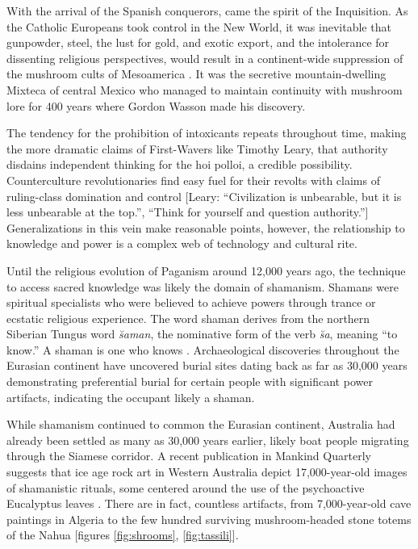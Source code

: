 \documentclass{UIdahoMastersThesis}
\begin{document}
With the arrival of the Spanish conquerors, came the spirit of the Inquisition. As the Catholic Europeans took control in the New World, it was inevitable that gunpowder, steel, the lust for gold, and exotic export, and the intolerance for dissenting religious perspectives, would result in a continent-wide suppression of the mushroom cults of Mesoamerica \cite{gallenkamp_maya_1959}. It was the secretive mountain-dwelling Mixteca of central Mexico who managed to maintain continuity with mushroom lore for 400 years where Gordon Wasson made his discovery. 

The tendency for the prohibition of intoxicants repeats throughout time, making the more dramatic claims of First-Wavers like Timothy Leary, that authority disdains independent thinking for the hoi polloi, a credible possibility. Counterculture revolutionaries find easy fuel for their revolts with claims of ruling-class domination and control [Leary: \enquote{Civilization is unbearable, but it is less unbearable at the top.}, \enquote{Think for yourself and question authority.}] Generalizations in this vein make reasonable points, however, the relationship to knowledge and power is a complex web of technology and cultural rite. 

Until the religious evolution of Paganism around 12,000 years ago, the technique to access sacred knowledge was likely the domain of shamanism. Shamans were spiritual specialists who were believed to achieve powers through trance or ecstatic religious experience. The word shaman derives from the northern Siberian Tungus word \emph{\u{s}aman}, the nominative form of the verb \emph{\u{s}a}, meaning ``to know.'' A shaman is one who knows \cite{athope_early_nodate}. Archaeological discoveries throughout the Eurasian continent have uncovered burial sites dating back as far as 30,000 years demonstrating preferential burial for certain people with significant power artifacts, indicating the occupant likely a shaman.

While shamanism continued to common the Eurasian continent, Australia had already been settled as many as 30,000 years earlier, likely boat people migrating through the Siamese corridor. A recent publication in Mankind Quarterly suggests that ice age rock art in Western Australia depict 17,000-year-old images of shamanistic rituals, some centered around the use of the psychoactive Eucalyptus leaves \cite{michaelsen_australian_2000}. There are in fact, countless artifacts, from 7,000-year-old cave paintings in Algeria to the few hundred surviving mushroom-headed stone totems of the Nahua [figures \ref{fig:shrooms}, \ref{fig:tassili}].
\end{document}
